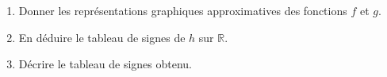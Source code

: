 \documentclass[10pt,a4paper]{article}
\begin{document}
\begin{sujets}
\begin{enumerate}
\item Donner les représentations graphiques approximatives des fonctions \(f\) et \(g\).

\vspace{2cm}

\item En déduire le tableau de signes de \(h\) sur \(\mathbb{R}\).

\vspace{4cm}

\item Décrire le tableau de signes obtenu.
\end{enumerate}

\end{sujets}

\newpage

\end{document}
